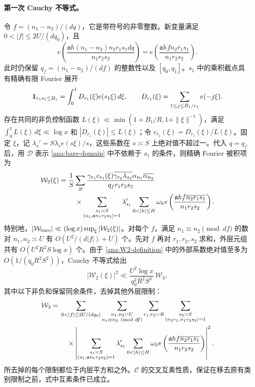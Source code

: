 \paragraph{第一次 Cauchy 不等式。}
令 $f=(n_1-n_2)/(dq)$，它是带符号的非零整数。新变量满足 $0<|f|\le2U/(dq_0)$，且
\begin{equation}\label{ana:f-phase}
 e\left(\frac{\mathfrak{a}h(n_1-n_2)\overline{n_2r_1s_1dq}}
                    {n_1r_2s_2}\right)
 =e\left(\frac{\mathfrak{a}hf\overline{n_2r_1s_1}}
                    {n_1r_2s_2}\right).
\end{equation}
此时仍保留 $q_f=(n_1-n_2)/(df)$ 的整数性以及 $[q_0,q_1]$。$s_1$ 中的乘积截点具有精确有限 Fourier 展开
\[
 \mathbf 1_{r_1s_1\le B_1}=
 \int_0^1D_{r_1}(\xi)e(s_1\xi)\,d\xi,
 \qquad
 D_{r_1}(\xi)=\sum_{1\le j\le B_1/r_1}e(-j\xi).
\]
存在共同的非负控制函数 $L(\xi)\ll\min(1+B_1/R,1+\|\xi\|^{-1})$，满足 $\int_0^1L(\xi)\,d\xi\ll\log x$ 和 $|D_{r_1}(\xi)|\le L(\xi)$；令 $c_{r_1}(\xi)=D_{r_1}(\xi)/L(\xi)$。固定 $\xi$，记 $\lambda_s'=S\lambda_s e(s\xi)/s$，这些系数在 $s\asymp S$ 上绝对值不超过一。代入 $q=q_f$ 后，用 $\mathscr D$ 表示 \eqref{ana:bare-domain} 中不依赖于 $s_1$ 的条件，则精确 Fourier 被积项为
\begin{align}\label{ana:W2-definition}
 \mathcal W_2(\xi)={}&\frac1S\sum_{\mathscr D}
 \frac{\gamma_{r_1}c_{r_1}(\xi)
              \overline{\gamma_{r_2}\lambda_{s_2}}
              \alpha_{n_1}\overline{\alpha_{n_2}}}
      {q_f r_1r_2s_2}\notag\\
 &\quad\times
 \sum_{\substack{s_1\asymp S\\(s_1,\mathfrak{a}n_1r_2s_2)=1}}
 \lambda_{s_1}'\sum_{0<|h|\le H}\omega_h
 e\left(\frac{\mathfrak{a}hf\overline{n_2r_1s_1}}{n_1r_2s_2}\right).
\end{align}
特别地，$|\mathcal W_{\rm bare}|\ll(\log x)\sup_\xi|\mathcal W_2(\xi)|$。对每个 $f$，满足 $n_1\equiv n_2\pmod{df}$ 的数对 $n_1,n_2\asymp U$ 有 $O(U^2/(d|f|)+U)$ 个。先对 $f$ 再对 $r_1,r_2,s_2$ 求和，外层元组共有 $O(U^2R^2S\log x)$ 个。由于 \eqref{ana:W2-definition} 中的外部系数绝对值至多为 $O(1/(q_0R^2S^2))$，Cauchy 不等式给出
\begin{equation}\label{ana:first-Cauchy}
 |\mathcal W_2(\xi)|^2
 \ll\frac{U^2\log x}{q_0^2R^2S^3}\,\mathcal W_3,
\end{equation}
其中以下非负和保留同余条件，去掉其他外层限制：
\begin{align}\label{ana:W3-definition}
 \mathcal W_3={}&
 \sum_{0<|f|\le2U/(dq_0)}
 \sum_{\substack{n_1,n_2\asymp U\\n_1\equiv n_2\pmod{df}}}
 \sum_{r_1,r_2\asymp R}
 \sum_{\substack{s_2\asymp S\\(n_2r_1,n_1r_2s_2)=1}}\notag\\
 &\quad\times
 \left|\sum_{\substack{s_1\asymp S\\(s_1,\mathfrak{a}n_1r_2s_2)=1}}
 \lambda_{s_1}'\sum_{0<|h|\le H}\omega_h
 e\left(\frac{\mathfrak{a}hf\overline{n_2r_1s_1}}{n_1r_2s_2}\right)
 \right|^2.
\end{align}
所去掉的每个限制都位于内层平方和之外。$\mathcal C$ 的交叉互素性质，保证在移去原有类别限制之前，式中互素条件已成立。

